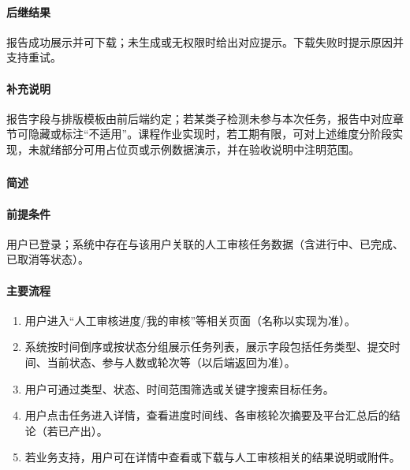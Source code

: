 \paragraph*{后继结果}

报告成功展示并可下载；未生成或无权限时给出对应提示。下载失败时提示原因并支持重试。

\paragraph*{补充说明}

报告字段与排版模板由前后端约定；若某类子检测未参与本次任务，报告中对应章节可隐藏或标注“不适用”。课程作业实现时，若工期有限，可对上述维度分阶段实现，未就绪部分可用占位页或示例数据演示，并在验收说明中注明范围。

\subsubsection{}

\paragraph*{简述}


\paragraph*{前提条件}

用户已登录；系统中存在与该用户关联的人工审核任务数据（含进行中、已完成、已取消等状态）。

\paragraph*{主要流程}

\begin{enumerate}
    \item 用户进入“人工审核进度/我的审核”等相关页面（名称以实现为准）。
    \item 系统按时间倒序或按状态分组展示任务列表，展示字段包括任务类型、提交时间、当前状态、参与人数或轮次等（以后端返回为准）。
    \item 用户可通过类型、状态、时间范围筛选或关键字搜索目标任务。
    \item 用户点击任务进入详情，查看进度时间线、各审核轮次摘要及平台汇总后的结论（若已产出）。
    \item 若业务支持，用户可在详情中查看或下载与人工审核相关的结果说明或附件。
\end{enumerate}

